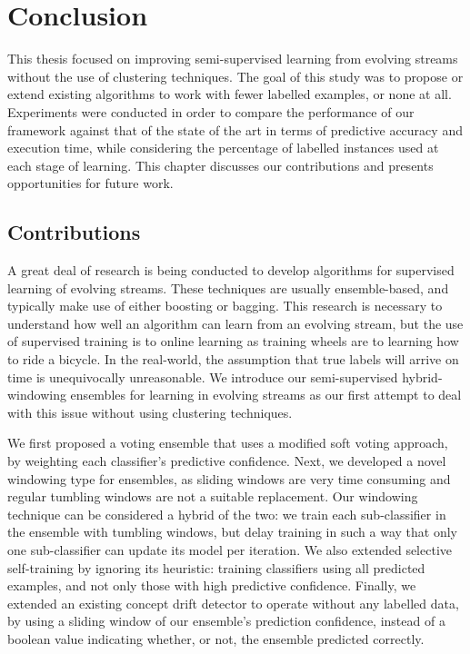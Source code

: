
\chapter{Conclusion\label{Chapter6}} %


This thesis focused on improving semi-supervised learning from evolving streams without the use of clustering techniques. The goal of this study was to propose or extend existing algorithms to work with fewer labelled examples, or none at all. Experiments were conducted in order to compare the performance of our framework against that of the state of the art in terms of predictive accuracy and execution time, while considering the percentage of labelled instances used at each stage of learning. This chapter discusses our contributions and presents opportunities for future work.

 
\section{Contributions}
A great deal of research is being conducted to develop algorithms for supervised learning of evolving streams. These techniques are usually ensemble-based, and typically make use of either boosting or bagging. This research is necessary to understand how well an algorithm can learn from an evolving stream, but the use of supervised training is to online learning as training wheels are to learning how to ride a bicycle. In the real-world, the assumption that true labels will arrive on time is unequivocally unreasonable. We introduce our semi-supervised hybrid-windowing ensembles for learning in evolving streams as our first attempt to deal with this issue without using clustering techniques.

We first proposed a voting ensemble that uses a modified soft voting approach, by weighting each classifier’s predictive confidence. Next, we developed a novel windowing type for ensembles, as sliding windows are very time consuming and regular tumbling windows are not a suitable replacement. Our windowing technique can be considered a hybrid of the two: we train each sub-classifier in the ensemble with tumbling windows, but delay training in such a way that only one sub-classifier can update its model per iteration. We also extended selective self-training by ignoring its heuristic: training classifiers using all predicted examples, and not only those with high predictive confidence. Finally, we extended an existing concept drift detector to operate without any labelled data, by using a sliding window of our ensemble’s prediction confidence, instead of a boolean value indicating whether, or not, the ensemble predicted correctly.


